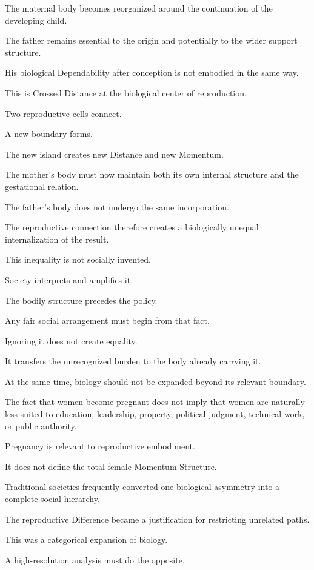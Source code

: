 The maternal body becomes reorganized around the continuation of the developing child.

The father remains essential to the origin and potentially to the wider support structure.

His biological Dependability after conception is not embodied in the same way.

This is Crossed Distance at the biological center of reproduction.

Two reproductive cells connect.

A new boundary forms.

The new island creates new Distance and new Momentum.

The mother’s body must now maintain both its own internal structure and the gestational relation.

The father’s body does not undergo the same incorporation.

The reproductive connection therefore creates a biologically unequal internalization of the result.

This inequality is not socially invented.

Society interprets and amplifies it.

The bodily structure precedes the policy.

Any fair social arrangement must begin from that fact.

Ignoring it does not create equality.

It transfers the unrecognized burden to the body already carrying it.

At the same time, biology should not be expanded beyond its relevant boundary.

The fact that women become pregnant does not imply that women are naturally less suited to education, leadership, property, political judgment, technical work, or public authority.

Pregnancy is relevant to reproductive embodiment.

It does not define the total female Momentum Structure.

Traditional societies frequently converted one biological asymmetry into a complete social hierarchy.

The reproductive Difference became a justification for restricting unrelated paths.

This was a categorical expansion of biology.

A high-resolution analysis must do the opposite.

